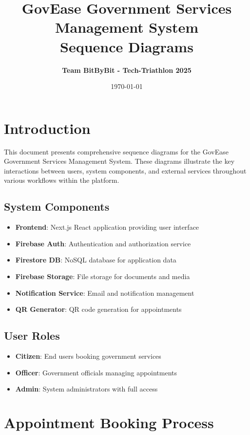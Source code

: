 \documentclass[12pt,a4paper]{article}
\title{\textbf{\color{primaryblue}GovEase Government Services Management System\\Sequence Diagrams}}
\author{\textbf{Team BitByBit - Tech-Triathlon 2025}}
\date{\today}
\begin{document}
\maketitle

\tableofcontents
\newpage

\section{Introduction}

This document presents comprehensive sequence diagrams for the GovEase Government Services Management System. These diagrams illustrate the key interactions between users, system components, and external services throughout various workflows within the platform.

\subsection{System Components}
\begin{itemize}[leftmargin=*]
    \item \textbf{Frontend}: Next.js React application providing user interface
    \item \textbf{Firebase Auth}: Authentication and authorization service
    \item \textbf{Firestore DB}: NoSQL database for application data
    \item \textbf{Firebase Storage}: File storage for documents and media
    \item \textbf{Notification Service}: Email and notification management
    \item \textbf{QR Generator}: QR code generation for appointments
\end{itemize}

\subsection{User Roles}
\begin{itemize}[leftmargin=*]
    \item \textbf{Citizen}: End users booking government services
    \item \textbf{Officer}: Government officials managing appointments
    \item \textbf{Admin}: System administrators with full access
\end{itemize}

\section{Appointment Booking Process}
\end{document}
